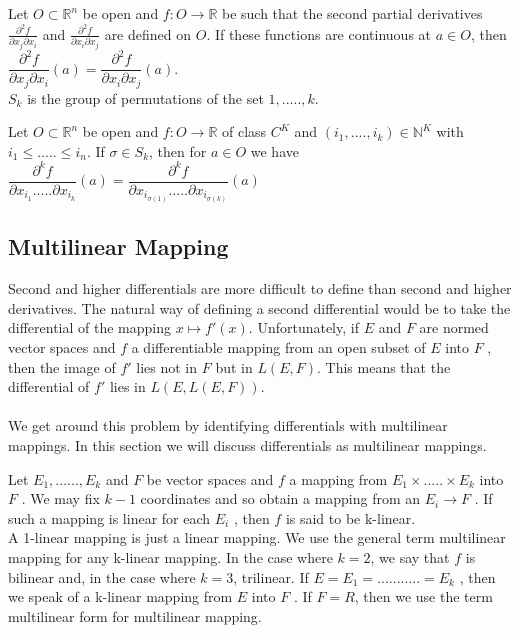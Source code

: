 \documentclass[11 pt]{article}
\theoremstyle{definition}
\theoremstyle{remark}
\newcommand{\R}{\mathbb{R}}
\newcommand{\N}{\mathbb{N}}
\begin{document}
\corollary
Let $O \subset \R^n$ be open and $f:O \to \R$ be such that the second partial derivatives $\frac{\partial^2 f}{\partial x_j \partial x_i}$ and $\frac{\partial^2 f}{\partial x_i \partial x_j}$ are defined on $O$. If these functions are continuous at $a \in O$, then\\

\hspace*{3cm} $\dfrac{\partial^2 f}{\partial x_j \partial x_i}(a) = \dfrac{\partial^2 f}{\partial x_i \partial x_j}(a)$.\\

\normalfont
$S_k$ is the group of permutations of the set ${1,.....,k}$.

\theorem Let $O \subset \R^n$ be open and $f:O \to \R$ of class $C^K$ and $(i_1,....,i_k) \in \N^K$ with $i_1 \leq .....\leq i_n$. If  $\sigma \in S_k$, then for $a \in O$ we have\\

\hspace*{3cm} $\dfrac{\partial^k f}{\partial x_{i_1}..... \partial x_{i_k}} (a) = \dfrac{\partial^k f}{\partial x_{i_{\sigma(1)}}..... \partial x_{i_{\sigma(k)}}} (a)$



\subsection{Multilinear Mapping}
\normalfont
Second and higher differentials are more difficult to define than second and higher
derivatives. The natural way of defining a second differential would be to take the
differential of the mapping $x \mapsto f'(x)$. Unfortunately, if $E$ and $F$ are normed
vector spaces and $f$ a differentiable mapping from an open subset of $E$ into $F$ ,
then the image of $f'$ lies not in $F$ but in $L(E,F)$. This means that the differential
of $f'$ lies in $L(E,L(E,F))$.\\ ~ \\
\quad We get around this problem by identifying differentials with multilinear mappings. In this section we will discuss differentials as multilinear mappings.

\newpage

Let $E_1,......,E_k$ and $F$ be vector spaces and $f$ a mapping from $E_1 \times .....\times E_k$ into $F$ . We may fix $k-1$ coordinates and so obtain a mapping from an $E_i \to F$ . If such
a mapping is linear for each $E_i$ , then $f$ is said to be k-linear. \\ \quad A 1-linear mapping is
just a linear mapping. We use the general term multilinear mapping for any k-linear
mapping. In the case where $k = 2$, we say that $f$ is bilinear and, in the case where
$k = 3$, trilinear. If $E = E_1 = ........... = E_k$ , then we speak of a k-linear mapping from
$E$ into $F$ . If $F = R$, then we use the term multilinear form for multilinear mapping.\\
\end{document}
